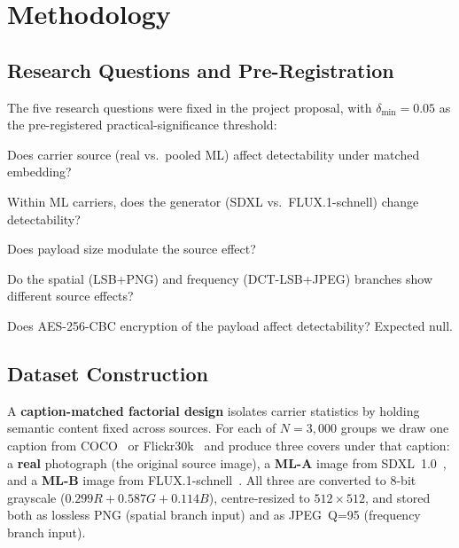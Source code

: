 \documentclass[10pt,twocolumn,a4paper]{article}
\begin{document}
\section{Methodology}
\label{sec:methods}

\subsection{Research Questions and Pre-Registration}
The five research questions were fixed in the project proposal, with $\delta_\text{min}\!=\!0.05$ as the pre-registered practical-significance threshold:
\begin{description}[font=\bfseries,leftmargin=1.2em,style=nextline,itemsep=2pt]
\item[RQ1 (primary, confirmatory)] Does carrier source (real vs.\ pooled ML) affect detectability under matched embedding?
\item[RQ2 (primary, confirmatory)] Within ML carriers, does the generator (SDXL vs.\ FLUX.1-schnell) change detectability?
\item[RQ3 (exploratory)] Does payload size modulate the source effect?
\item[RQ4 (exploratory)] Do the spatial (LSB+PNG) and frequency (DCT-LSB+JPEG) branches show different source effects?
\item[RQ5 (verification)] Does AES-256-CBC encryption of the payload affect detectability? Expected null.
\end{description}

\subsection{Dataset Construction}
\label{sec:dataset}
A \textbf{caption-matched factorial design} isolates carrier statistics by holding semantic content fixed across sources. For each of $N\!=\!3{,}000$ groups we draw one caption from COCO~\cite{coco2014} or Flickr30k~\cite{flickr30k2014} and produce three covers under that caption: a \textbf{real} photograph (the original source image), a \textbf{ML-A} image from SDXL~1.0~\cite{sdxl2023}, and a \textbf{ML-B} image from FLUX.1-schnell~\cite{flux2024}. All three are converted to 8-bit grayscale ($0.299R\!+\!0.587G\!+\!0.114B$), centre-resized to $512\!\times\!512$, and stored both as lossless PNG (spatial branch input) and as JPEG~Q=95 (frequency branch input).
\end{document}

